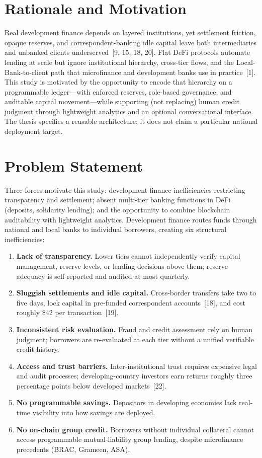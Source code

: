 \documentclass[12pt, a4paper]{report}
\begin{document}
\section{Rationale and Motivation}
\label{sec:rationale}

Real development finance depends on layered institutions, yet settlement friction, opaque reserves, and correspondent-banking idle capital leave both intermediaries and unbanked clients underserved~[9, 15, 18, 20]. Flat DeFi protocols automate lending at scale but ignore institutional hierarchy, cross-tier flows, and the Local-Bank-to-client path that microfinance and development banks use in practice~[1]. This study is motivated by the opportunity to encode that hierarchy on a programmable ledger---with enforced reserves, role-based governance, and auditable capital movement---while supporting (not replacing) human credit judgment through lightweight analytics and an optional conversational interface. The thesis specifies a reusable architecture; it does not claim a particular national deployment target.

\section{Problem Statement}

Three forces motivate this study: development-finance inefficiencies restricting transparency and settlement; absent multi-tier banking functions in DeFi (deposits, solidarity lending); and the opportunity to combine blockchain auditability with lightweight analytics. Development finance routes funds through national and local banks to individual borrowers, creating six structural inefficiencies:

\begin{enumerate}[noitemsep]
\item \textbf{Lack of transparency.} Lower tiers cannot independently verify capital management, reserve levels, or lending decisions above them; reserve adequacy is self-reported and audited at most quarterly.
\item \textbf{Sluggish settlements and idle capital.} Cross-border transfers take two to five days, lock capital in pre-funded correspondent accounts~[18], and cost roughly \$42 per transaction~[19].
\item \textbf{Inconsistent risk evaluation.} Fraud and credit assessment rely on human judgment; borrowers are re-evaluated at each tier without a unified verifiable credit history.
\item \textbf{Access and trust barriers.} Inter-institutional trust requires expensive legal and audit processes; developing-country investors earn returns roughly three percentage points below developed markets~[22].
\item \textbf{No programmable savings.} Depositors in developing economies lack real-time visibility into how savings are deployed.
\item \textbf{No on-chain group credit.} Borrowers without individual collateral cannot access programmable mutual-liability group lending, despite microfinance precedents (BRAC, Grameen, ASA).
\end{enumerate}
\end{document}
